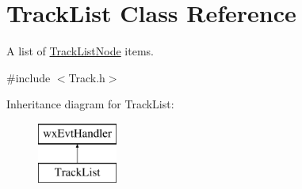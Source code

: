 \hypertarget{class_track_list}{}\section{Track\+List Class Reference}
\label{class_track_list}


A list of \hyperlink{struct_track_list_node}{Track\+List\+Node} items.  




{\ttfamily \#include $<$Track.\+h$>$}

Inheritance diagram for Track\+List\+:\begin{figure}[H]
\begin{center}
\leavevmode
\includegraphics[height=2.000000cm]{class_track_list}
\end{center}
\end{figure}
